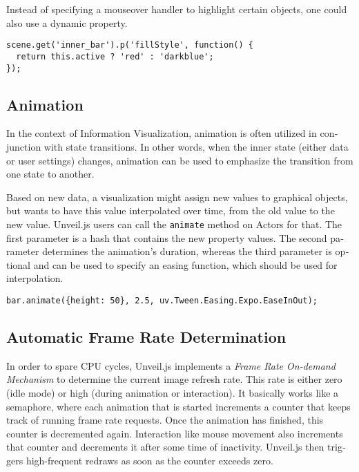 \begin{english}
\SuperPar Instead of specifying a mouseover handler to highlight certain objects, one could also use a dynamic property.

\begin{verbatim}
scene.get('inner_bar').p('fillStyle', function() {
  return this.active ? 'red' : 'darkblue';
});
\end{verbatim}


\subsection{Animation}

In the context of Information Visualization, animation is often utilized in conjunction with state transitions. In other words, when the inner state (either data or user settings) changes, animation can be used to emphasize the transition from one state to another.

Based on new data, a visualization might assign new values to graphical objects, but wants to have this value interpolated over time, from the old value to the new value. Unveil.js users can call the \texttt{animate} method on Actors for that. The first parameter is a hash that contains the new property values. The second parameter determines the animation's duration, whereas the third parameter is optional and can be used to specify an easing function, which should be used for interpolation.

\begin{verbatim}
bar.animate({height: 50}, 2.5, uv.Tween.Easing.Expo.EaseInOut);
\end{verbatim}


\subsection{Automatic Frame Rate Determination}

In order to spare CPU cycles, Unveil.js implements a \emph{Frame Rate On-demand Mechanism} to determine the current image refresh rate. This rate is either zero (idle mode) or high (during animation or interaction). It basically works like a semaphore, where each animation that is started increments a counter that keeps track of running frame rate requests. Once the animation has finished, this counter is decremented again. Interaction like mouse movement also increments that counter and decrements it after some time of inactivity. Unveil.js then triggers high-frequent redraws as soon as the counter exceeds zero.


\end{english}
